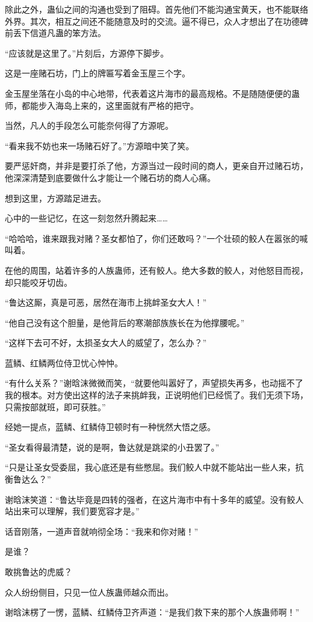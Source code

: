 \begin{this_body}
除此之外，蛊仙之间的沟通也受到了阻碍。首先他们不能沟通宝黄天，也不能联络外界。其次，相互之间还不能随意及时的交流。逼不得已，众人才想出了在功德碑前丢下信道凡蛊的笨方法。

“应该就是这里了。”片刻后，方源停下脚步。

这是一座赌石坊，门上的牌匾写着金玉屋三个字。

金玉屋坐落在小岛的中心地带，代表着这片海市的最高规格。不是随随便便的蛊师，都能步入海岛上来的，这里面就有严格的把守。

当然，凡人的手段怎么可能奈何得了方源呢。

“看来我不妨也来一场赌石好了。”方源暗中笑了笑。

要严惩奸商，并非是要打杀了他，方源当过一段时间的商人，更亲自开过赌石坊，他深深清楚到底要做什么才能让一个赌石坊的商人心痛。

想到这里，方源踏足进去。

心中的一些记忆，在这一刻忽然升腾起来……

“哈哈哈，谁来跟我对赌？圣女都怕了，你们还敢吗？”一个壮硕的鲛人在嚣张的喊叫着。

在他的周围，站着许多的人族蛊师，还有鲛人。绝大多数的鲛人，对他怒目而视，却只能咬牙切齿。

“鲁达这厮，真是可恶，居然在海市上挑衅圣女大人！”

“他自己没有这个胆量，是他背后的寒潮部族族长在为他撑腰呢。”

“这样下去可不好，太损圣女大人的威望了，怎么办？”

蓝鳞、红鳞两位侍卫忧心忡忡。

“有什么关系？”谢晗沫微微而笑，“就要他叫嚣好了，声望损失再多，也动摇不了我的根本。对方使出这样的法子来挑衅我，正说明他们已经慌了。我们无须下场，只需按部就班，即可获胜。”

经她一提点，蓝鳞、红鳞侍卫顿时有一种恍然大悟之感。

“圣女看得最清楚，说的是啊，鲁达就是跳梁的小丑罢了。”

“只是让圣女受委屈，我心底还是有些憋屈。我们鲛人中就不能站出一些人来，抗衡鲁达么？”

谢晗沫笑道：“鲁达毕竟是四转的强者，在这片海市中有十多年的威望。没有鲛人站出来可以理解，我们要宽容才是。”

话音刚落，一道声音就响彻全场：“我来和你对赌！”

是谁？

敢挑鲁达的虎威？

众人纷纷侧目，只见一位人族蛊师越众而出。

谢晗沫楞了一愣，蓝鳞、红鳞侍卫齐声道：“是我们救下来的那个人族蛊师啊！”


\end{this_body}
